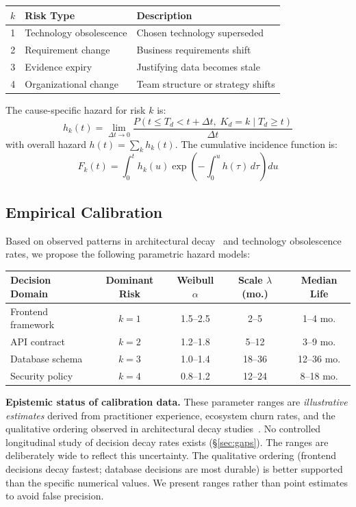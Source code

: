 \documentclass[11pt, a4paper, copyright]{googledeepmind}
\begin{document}
\begin{center}
\begin{tabular}{clp{7cm}}
\toprule
$k$ & Risk Type & Description \\
\midrule
1 & Technology obsolescence & Chosen technology superseded \\
2 & Requirement change & Business requirements shift \\
3 & Evidence expiry & Justifying data becomes stale \\
4 & Organizational change & Team structure or strategy shifts \\
\bottomrule
\end{tabular}
\end{center}

The cause-specific hazard for risk $k$ is:
\begin{equation}
    h_k(t) = \lim_{\Delta t \to 0} \frac{P(t \leq T_d < t + \Delta t, \; K_d = k \mid T_d \geq t)}{\Delta t}
\end{equation}
with overall hazard $h(t) = \sum_k h_k(t)$. The cumulative incidence function is:
\begin{equation}
    F_k(t) = \int_0^t h_k(u) \exp\!\left(-\int_0^u h(\tau)\, d\tau\right) du
\end{equation}

\subsection{Empirical Calibration}

Based on observed patterns in architectural decay~\citep{le2018} and technology obsolescence rates, we propose the following parametric hazard models:

\begin{center}
\begin{tabular}{lcccc}
\toprule
Decision Domain & Dominant Risk & Weibull $\alpha$ & Scale $\lambda$ (mo.) & Median Life \\
\midrule
Frontend framework & $k=1$ & 1.5--2.5 & 2--5 & 1--4 mo. \\
API contract & $k=2$ & 1.2--1.8 & 5--12 & 3--9 mo. \\
Database schema & $k=3$ & 1.0--1.4 & 18--36 & 12--36 mo. \\
Security policy & $k=4$ & 0.8--1.2 & 12--24 & 8--18 mo. \\
\bottomrule
\end{tabular}
\end{center}

\textbf{Epistemic status of calibration data.} These parameter ranges are \emph{illustrative estimates} derived from practitioner experience, ecosystem churn rates, and the qualitative ordering observed in architectural decay studies~\citep{le2018, herraiz2021}. No controlled longitudinal study of decision decay rates exists (\S\ref{sec:gaps}). The ranges are deliberately wide to reflect this uncertainty. The qualitative ordering (frontend decisions decay fastest; database decisions are most durable) is better supported than the specific numerical values. We present ranges rather than point estimates to avoid false precision.
\end{document}
